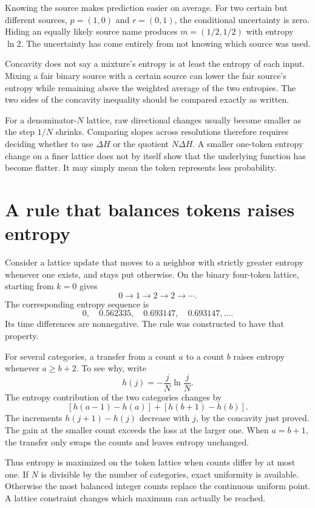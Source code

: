 \documentclass[11pt,oneside,openany]{book}
\theoremstyle{definition}
\theoremstyle{remark}
\numberwithin{equation}{chapter}
\begin{document}
Knowing the source makes prediction easier on average. For two certain but different sources, \(p=(1,0)\) and \(r=(0,1)\), the conditional uncertainty is zero. Hiding an equally likely source name produces \(m=(1/2,1/2)\) with entropy \(\ln2\). The uncertainty has come entirely from not knowing which source was used.

Concavity does not say a mixture's entropy is at least the entropy of each input. Mixing a fair binary source with a certain source can lower the fair source's entropy while remaining above the weighted average of the two entropies. The two sides of the concavity inequality should be compared exactly as written.

For a denominator-\(N\) lattice, raw directional changes usually become smaller as the step \(1/N\) shrinks. Comparing slopes across resolutions therefore requires deciding whether to use \(\Delta H\) or the quotient \(N\Delta H\). A smaller one-token entropy change on a finer lattice does not by itself show that the underlying function has become flatter. It may simply mean the token represents less probability.

\section{A rule that balances tokens raises entropy}\label{ch05-a-rule-that-balances-tokens-raises-entropy}

Consider a lattice update that moves to a neighbor with strictly greater entropy whenever one exists, and stays put otherwise. On the binary four-token lattice, starting from \(k=0\) gives \[0\to1\to2\to2\to\cdots.\] The corresponding entropy sequence is \[0,\quad0.562335,\quad0.693147,\quad0.693147,\ldots.\] Its time differences are nonnegative. The rule was constructed to have that property.

For several categories, a transfer from a count \(a\) to a count \(b\) raises entropy whenever \(a\geq b+2\). To see why, write \[h(j)=-\frac jN\ln\frac jN.\] The entropy contribution of the two categories changes by \[[h(a-1)-h(a)]+[h(b+1)-h(b)].\] The increments \(h(j+1)-h(j)\) decrease with \(j\), by the concavity just proved. The gain at the smaller count exceeds the loss at the larger one. When \(a=b+1\), the transfer only swaps the counts and leaves entropy unchanged.

Thus entropy is maximized on the token lattice when counts differ by at most one. If \(N\) is divisible by the number of categories, exact uniformity is available. Otherwise the most balanced integer counts replace the continuous uniform point. A lattice constraint changes which maximum can actually be reached.
\end{document}
